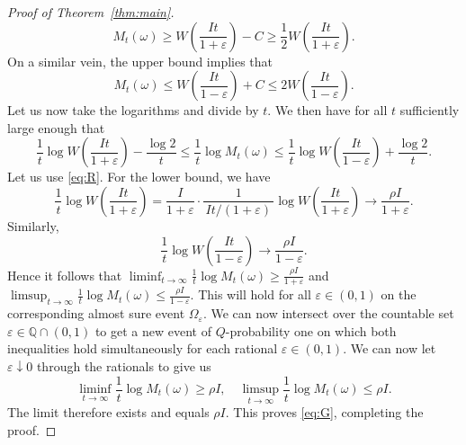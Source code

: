 \documentclass{article}
\theoremstyle{definition}
\begin{document}
\begin{proof}[Proof of Theorem~\ref{thm:main}]
\[
M_t(\omega)\ge W\left(\frac{It}{1+\varepsilon}\right)-C\ge \frac{1}{2}W\left(\frac{It}{1+\varepsilon}\right).
\]
On a similar vein, the upper bound implies that
\[
M_t(\omega)\le W\left(\frac{It}{1-\varepsilon}\right)+C\le 2W\left(\frac{It}{1-\varepsilon}\right).
\]
Let us now take the logarithms and divide by $t$. We then have for all $t$ sufficiently large enough that
\[
\frac{1}{t}\log W\left(\frac{It}{1+\varepsilon}\right) - \frac{\log 2}{t} \le \frac{1}{t}\log M_t(\omega) \le \frac{1}{t}\log W\left(\frac{It}{1-\varepsilon}\right) + \frac{\log 2}{t}.
\]
Let us use \eqref{eq:R}. For the lower bound, we have
\[
\frac{1}{t}\log W\left(\frac{It}{1+\varepsilon}\right) = \frac{I}{1+\varepsilon} \cdot \frac{1}{\,It/(1+\varepsilon)\,} \log W\left(\frac{It}{1+\varepsilon}\right) \longrightarrow \frac{\rho I}{1+\varepsilon}.
\]
Similarly, 
\[
\frac{1}{t}\log W\left(\frac{It}{1-\varepsilon}\right)\longrightarrow \frac{\rho I}{1-\varepsilon}.
\]
Hence it follows that $\liminf_{t\to\infty} \frac{1}{t}\log M_t(\omega) \ge \frac{\rho I}{1+\varepsilon}$ and $\limsup_{t\to\infty} \frac{1}{t}\log M_t(\omega) \le \frac{\rho I}{1-\varepsilon}$. This will hold for all $\varepsilon\in(0,1)$ on the corresponding almost sure event $\Omega_{\varepsilon}$. We can now intersect over the countable set $\varepsilon\in \mathbb  Q\cap(0,1)$ to get a new event of $Q$-probability one on which both inequalities hold simultaneously for each rational $\varepsilon\in(0,1)$. We can now let $\varepsilon\downarrow 0$ through the rationals to give us
\[
\liminf_{t\to\infty}\frac{1}{t}\log M_t(\omega)\ge \rho I,\quad \limsup_{t\to\infty}\frac{1}{t}\log M_t(\omega)\le \rho I.
\]
The limit therefore exists and equals $\rho I$. This proves \eqref{eq:G}, completing the proof.
\end{proof}
\end{document}
